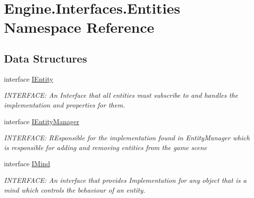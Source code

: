 \hypertarget{a00259}{}\section{Engine.\+Interfaces.\+Entities Namespace Reference}
\label{a00259}
\subsection*{Data Structures}
\begin{DoxyCompactItemize}
\item 
interface \hyperlink{a00438}{I\+Entity}
\begin{DoxyCompactList}\small\item\em I\+N\+T\+E\+R\+F\+A\+CE\+: An Interface that all entities must subscribe to and handles the implementation and properties for them. \end{DoxyCompactList}\item 
interface \hyperlink{a00442}{I\+Entity\+Manager}
\begin{DoxyCompactList}\small\item\em I\+N\+T\+E\+R\+F\+A\+CE\+: R\+Esponsible for the implementation found in Entity\+Manager which is responsible for adding and removing entities from the game scene \end{DoxyCompactList}\item 
interface \hyperlink{a00446}{I\+Mind}
\begin{DoxyCompactList}\small\item\em I\+N\+T\+E\+R\+F\+A\+CE\+: An interface that provides Implementation for any object that is a mind which controls the behaviour of an entity. \end{DoxyCompactList}\end{DoxyCompactItemize}
